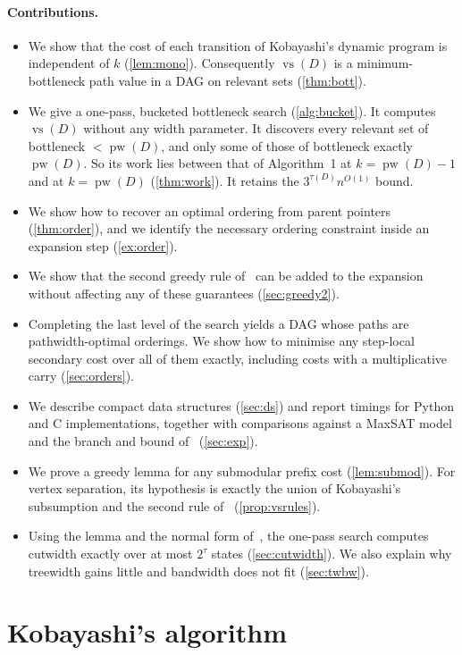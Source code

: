 \documentclass[11pt]{article}
\theoremstyle{definition}
\newcommand{\vs}{\operatorname{vs}}
\newcommand{\pw}{\operatorname{pw}}
\begin{document}
\paragraph{Contributions.}
\begin{itemize}
\item We show that the cost of each transition of Kobayashi's dynamic
program is independent of $k$ (\cref{lem:mono}). Consequently $\vs(D)$ is a
minimum-bottleneck path value in a DAG on relevant sets (\cref{thm:bott}).
\item We give a one-pass, bucketed bottleneck search
(\cref{alg:bucket}). It computes $\vs(D)$ without any width parameter. It
discovers every relevant set of bottleneck $<\pw(D)$, and only some of those
of bottleneck exactly $\pw(D)$. So its work lies between that of
Algorithm~1 at $k=\pw(D)-1$ and at $k=\pw(D)$ (\cref{thm:work}). It retains
the $3^{\tau(D)}n^{O(1)}$ bound.
\item We show how to recover an optimal ordering from parent pointers
(\cref{thm:order}), and we identify the necessary ordering constraint inside
an expansion step (\cref{ex:order}).
\item We show that the second greedy rule of~\cite{CMN14} can be added to
the expansion without affecting any of these guarantees
(\cref{sec:greedy2}).
\item Completing the last level of the search yields a DAG whose paths are
pathwidth-optimal orderings. We show how to minimise any step-local secondary
cost over all of them exactly, including costs with a multiplicative carry
(\cref{sec:orders}).
\item We describe compact data structures (\cref{sec:ds}) and report
timings for Python and C implementations, together with comparisons against
a MaxSAT model and the branch and bound of~\cite{CMN14} (\cref{sec:exp}).
\item We prove a greedy lemma for any submodular prefix cost
(\cref{lem:submod}). For vertex separation, its hypothesis is exactly the
union of Kobayashi's subsumption and the second rule of~\cite{CMN14}
(\cref{prop:vsrules}).
\item Using the lemma and the normal form of~\cite{CLPPS14}, the one-pass
search computes cutwidth exactly over at most $2^{\tau}$ states
(\cref{sec:cutwidth}). We also explain why treewidth gains little and
bandwidth does not fit (\cref{sec:twbw}).
\end{itemize}

\section{Kobayashi's algorithm}\label{sec:kob}
\end{document}
